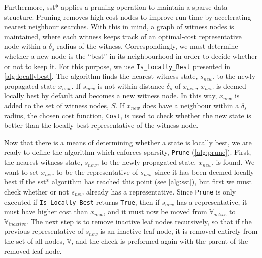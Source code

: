Furthermore, \gls{sst}* applies a pruning operation to maintain a sparse data structure. Pruning removes high-cost nodes to improve run-time by accelerating nearest neighbour searches. With this in mind, a graph of witness nodes is maintained, where each witness keeps track of an optimal-cost representative node within a $\delta_s$-radius of the witness. Correspondingly, we must determine whether a new node is the ``best'' in its neighbourhood in order to decide whether or not to keep it. For this purpose, we use \texttt{Is\_Locally\_Best} presented in \autoref{alg:locallybest}. The algorithm finds the nearest witness state, $s_{new}$, to the newly propagated state $x_{new}$. If $s_{new}$ is not within distance $\delta_s$ of $x_{new}$, $x_{new}$ is deemed locally best by default and becomes a new witness node. In this way, $x_{new}$ is added to the set of witness nodes, $S$. If $x_{new}$ does have a neighbour within a $\delta_s$ radius, the chosen cost function, \texttt{Cost}, is used to check whether the new state is better than the locally best representative of the witness node.

Now that there is a means of determining whether a state is locally best, we are ready to define the algorithm which enforces sparsity, \texttt{Prune} (\autoref{alg:prune}). First, the nearest witness state, $s_{new}$, to the newly propagated state, $x_{new}$, is found. We want to set $x_{new}$ to be the representative of $s_{new}$ since it has been deemed locally best if the \gls{sst}* algorithm has reached this point (see \autoref{alg:sst}), but first we must check whether or not $s_{new}$ already has a representative. Since \texttt{Prune} is only executed if \texttt{Is\_Locally\_Best} returns \texttt{True}, then if $s_{new}$ has a representative, it must have higher cost than $x_{new}$, and it must now be moved from $\mathbb{V}_{active}$ to $\mathbb{V}_{inactive}$. The next step is to remove inactive leaf nodes recursively, so that if the previous representative of $s_{new}$ is an inactive leaf node, it is removed entirely from the set of all nodes, $\mathbb{V}$, and the check is preformed again with the parent of the removed leaf node.

